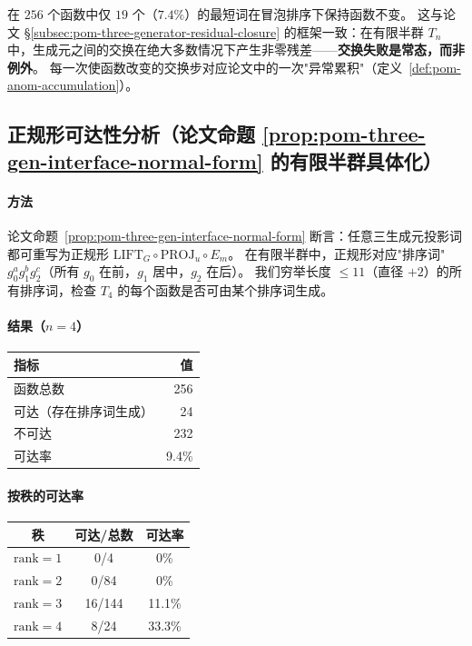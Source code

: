 \begin{remark}[非交换性是普遍现象]\label{rem:formal-noncommutativity}
在 $256$ 个函数中仅 $19$ 个（$7.4\%$）的最短词在冒泡排序下保持函数不变。
这与论文 \S\ref{subsec:pom-three-generator-residual-closure} 的框架一致：在有限半群 $T_n$ 中，生成元之间的交换在绝大多数情况下产生非零残差——\textbf{交换失败是常态，而非例外}。
每一次使函数改变的交换步对应论文中的一次"异常累积"（定义~\ref{def:pom-anom-accumulation}）。
\end{remark}

\subsection{正规形可达性分析（论文命题 \ref{prop:pom-three-gen-interface-normal-form} 的有限半群具体化）}

\paragraph{方法}
论文命题~\ref{prop:pom-three-gen-interface-normal-form} 断言：任意三生成元投影词都可重写为正规形 $\mathrm{LIFT}_G\circ\mathrm{PROJ}_u\circ E_m$。
在有限半群中，正规形对应"排序词"$g_0^a g_1^b g_2^c$（所有 $g_0$ 在前，$g_1$ 居中，$g_2$ 在后）。
我们穷举长度 $\le 11$（直径 $+2$）的所有排序词，检查 $T_4$ 的每个函数是否可由某个排序词生成。

\paragraph{结果（$n=4$）}

\begin{center}
\begin{tabular}{l|r}
\toprule
指标 & 值 \\
\midrule
函数总数 & 256 \\
可达（存在排序词生成） & 24 \\
不可达 & 232 \\
可达率 & 9.4\% \\
\bottomrule
\end{tabular}
\end{center}

\paragraph{按秩的可达率}

\begin{center}
\begin{tabular}{c|c|c}
\toprule
秩 & 可达/总数 & 可达率 \\
\midrule
$\mathrm{rank}=1$ & 0/4 & 0\% \\
$\mathrm{rank}=2$ & 0/84 & 0\% \\
$\mathrm{rank}=3$ & 16/144 & 11.1\% \\
$\mathrm{rank}=4$ & 8/24 & 33.3\% \\
\bottomrule
\end{tabular}
\end{center}

